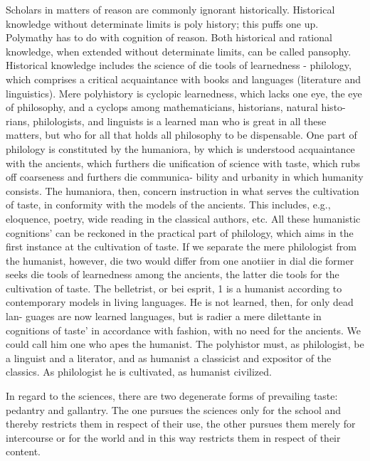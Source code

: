 Scholars in matters of reason are commonly ignorant historically.
Historical knowledge without determinate limits is poly history; this puffs
one up. Polymathy has to do with cognition of reason. Both historical and
rational knowledge, when extended without determinate limits, can be
called pansophy. Historical knowledge includes the science of die tools of
learnedness - philology, which comprises a critical acquaintance with
books and languages (literature and linguistics).
Mere polyhistory is cyclopic learnedness, which lacks one eye, the eye of
philosophy, and a cyclops among mathematicians, historians, natural histo-
rians, philologists, and linguists is a learned man who is great in all these
matters, but who for all that holds all philosophy to be dispensable.
One part of philology is constituted by the humaniora, by which is
understood acquaintance with the ancients, which furthers die unification
of science with taste, which rubs off coarseness and furthers die communica-
bility and urbanity in which humanity consists.
The humaniora, then, concern instruction in what serves the cultivation
of taste, in conformity with the models of the ancients. This includes, e.g.,
eloquence, poetry, wide reading in the classical authors, etc. All these
humanistic cognitions' can be reckoned in the practical part of philology,
which aims in the first instance at the cultivation of taste. If we separate
the mere philologist from the humanist, however, die two would differ
from one anotiier in dial die former seeks die tools of learnedness among
the ancients, the latter die tools for the cultivation of taste.
The belletrist, or bei esprit, 1 is a humanist according to contemporary
models in living languages. He is not learned, then, for only dead lan-
guages are now learned languages, but is radier a mere dilettante in
cognitions of taste' in accordance with fashion, with no need for the
ancients. We could call him one who apes the humanist. The polyhistor
must, as philologist, be a linguist and a literator, and as humanist a
classicist and expositor of the classics. As philologist he is cultivated, as
humanist civilized.

In regard to the sciences, there are
two degenerate forms of prevailing taste: pedantry and gallantry.
The one pursues the sciences only for the school and
thereby restricts them in respect of their use,
the other pursues them merely for intercourse or for the world and
in this way restricts them in respect of their content.

